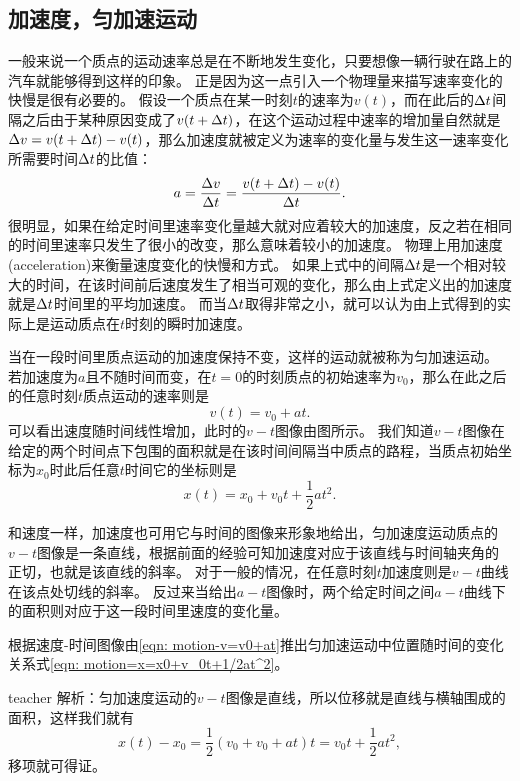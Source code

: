 \subsection{加速度，匀加速运动}
一般来说一个质点的运动速率总是在不断地发生变化，只要想像一辆行驶在路上的汽车就能够得到这样的印象。
正是因为这一点引入一个物理量来描写速率变化的快慢是很有必要的。
假设一个质点在某一时刻$t$的速率为$v(t)$，而在此后的$\Delta t$间隔之后由于某种原因变成了$v(t+\Delta t)$，在这个运动过程中速率的增加量自然就是$\Delta v = v(t+\Delta t)-v(t)$，那么加速度就被定义为速率的变化量与发生这一速率变化所需要时间$\Delta t$的比值：
\begin{equation}\label{eqn: motion-加速度的定义}
a = \frac{\Delta v}{\Delta t} = \frac{ v(t+\Delta t)-v(t)}{\Delta t}.
\end{equation}
很明显，如果在给定时间里速率变化量越大就对应着较大的加速度，反之若在相同的时间里速率只发生了很小的改变，那么意味着较小的加速度。
物理上用{\heiti 加速度(acceleration)}来衡量速度变化的快慢和方式。
如果上式中的间隔$\Delta t$是一个相对较大的时间，在该时间前后速度发生了相当可观的变化，那么由上式定义出的加速度就是$\Delta t$时间里的{\heiti 平均加速度}。
而当$\Delta t$取得非常之小，就可以认为由上式得到的实际上是运动质点在$t$时刻的{\heiti 瞬时加速度}。

当在一段时间里质点运动的加速度保持不变，这样的运动就被称为{\heiti 匀加速运动}。
若加速度为$a$且不随时间而变，在$t=0$的时刻质点的初始速率为$v_0$，那么在此之后的任意时刻$t$质点运动的速率则是
\begin{equation}\label{eqn: motion-v=v0+at}
v(t)=v_0+at.
\end{equation}
可以看出速度随时间线性增加，此时的$v-t$图像由图所示。
我们知道$v-t$图像在给定的两个时间点下包围的面积就是在该时间间隔当中质点的路程，当质点初始坐标为$x_0$时此后任意$t$时间它的坐标则是
\begin{equation}\label{eqn: motion=x=x0+v_0t+1/2at^2}
x(t)=x_0+v_0t+\frac{1}{2}at^2.
\end{equation}

和速度一样，加速度也可用它与时间的图像来形象地给出，匀加速度运动质点的$v-t$图像是一条直线，根据前面的经验可知加速度对应于该直线与时间轴夹角的正切，也就是该直线的斜率。
对于一般的情况，在任意时刻$t$加速度则是$v-t$曲线在该点处切线的斜率。
反过来当给出$a-t$图像时，两个给定时间之间$a-t$曲线下的面积则对应于这一段时间里速度的变化量。


\begin{example}
根据速度-时间图像由\ref{eqn: motion-v=v0+at}推出匀加速运动中位置随时间的变化关系式\ref{eqn: motion=x=x0+v_0t+1/2at^2}。
\begin{taggedblock}{teacher}
\newline
解析：匀加速度运动的$v-t$图像是直线，所以位移就是直线与横轴围成的面积，这样我们就有
\[
x(t)-x_0 = \frac{1}{2}(v_0+v_0+at)t = v_0t+\frac{1}{2}at^2,
\]
移项就可得证。
\end{taggedblock}
\end{example}

